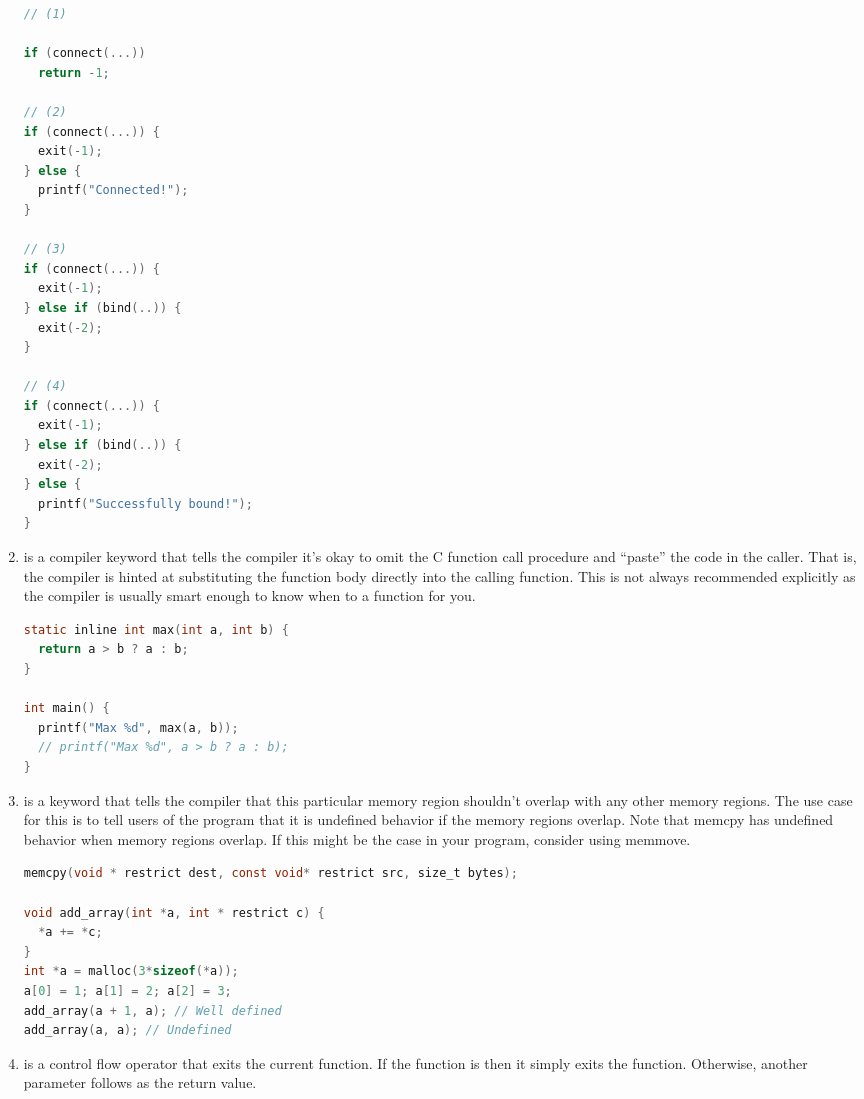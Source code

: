 \begin{enumerate}
	      \begin{lstlisting}[language=C]
// (1)

if (connect(...))
  return -1;

// (2)
if (connect(...)) {
  exit(-1);
} else {
  printf("Connected!");
}

// (3)
if (connect(...)) {
  exit(-1);
} else if (bind(..)) {
  exit(-2);
}

// (4)
if (connect(...)) {
  exit(-1);
} else if (bind(..)) {
  exit(-2);
} else {
  printf("Successfully bound!");
}
\end{lstlisting}

	    \item {} is a compiler keyword that tells the compiler it's okay to omit the C function call procedure and ``paste'' the code in the caller.
        That is, the compiler is hinted at substituting the function body directly into the calling function.
        This is not always recommended explicitly as the compiler is usually smart enough to know when to  a function for you.

	      \begin{lstlisting}[language=C]
static inline int max(int a, int b) {
  return a > b ? a : b;
}

int main() {
  printf("Max %d", max(a, b));
  // printf("Max %d", a > b ? a : b);
}
\end{lstlisting}

	    \item {} is a keyword that tells the compiler that this particular memory region shouldn't overlap with any other memory regions.
        The use case for this is to tell users of the program that it is undefined behavior if the memory regions overlap.
        Note that memcpy has undefined behavior when memory regions overlap.
        If this might be the case in your program, consider using memmove.

	      \begin{lstlisting}[language=C]
memcpy(void * restrict dest, const void* restrict src, size_t bytes);

void add_array(int *a, int * restrict c) {
  *a += *c;
}
int *a = malloc(3*sizeof(*a));
a[0] = 1; a[1] = 2; a[2] = 3;
add_array(a + 1, a); // Well defined
add_array(a, a); // Undefined
\end{lstlisting}

	    \item {} is a control flow operator that exits the current function.
        If the function is  then it simply exits the function.
        Otherwise, another parameter follows as the return value.


\end{enumerate}
